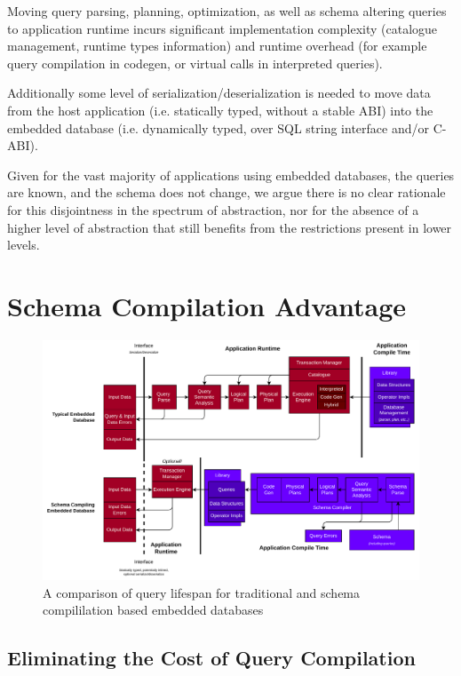 \documentclass[conference]{IEEEtran}
\begin{document}
Moving query parsing, planning, optimization, as well as schema altering queries to application
runtime incurs significant implementation complexity (catalogue management, runtime types information)
and runtime overhead (for example query compilation in codegen, or virtual calls in interpreted queries).

Additionally some level of serialization/deserialization is needed to move data from the host application
(i.e. statically typed, without a stable ABI) into the embedded database (i.e. dynamically typed, over SQL string interface and/or C-ABI).

Given for the vast majority of applications using embedded databases, the queries are known, and the schema does not change, we argue there
is no clear rationale for this disjointness in the spectrum of abstraction, nor for the absence
of a higher level of abstraction that still benefits from the restrictions present in lower levels.

\section{Schema Compilation Advantage}

\begin{figure}[b]
    \centering
    \includegraphics[width=\textwidth]{_diagrams/query_lifespan.pdf}
    \caption{A comparison of query lifespan for traditional and schema compililation based embedded databases}
    \label{fig:query-lifespan}
\end{figure}

\subsection{Eliminating the Cost of Query Compilation}
\end{document}
